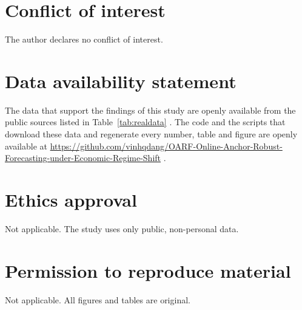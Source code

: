 \documentclass[12pt]{article}
\theoremstyle{plain}
\theoremstyle{remark}
\begin{document}
\section*{Conflict of interest}
The author declares no conflict of interest.

\section*{Data availability statement}
The data that support the findings of this study are openly available from the
public sources listed in Table~\ref{tab:realdata}
\citep{fred2026data,caldara2026gprdata,baker2026epudata}. The code and the scripts
that download these data and regenerate every number, table and figure are openly
available at
\url{https://github.com/vinhqdang/OARF-Online-Anchor-Robust-Forecasting-under-Economic-Regime-Shift}
\citep{dang2026oarfcode}.

\section*{Ethics approval}
Not applicable. The study uses only public, non-personal data.

\section*{Permission to reproduce material}
Not applicable. All figures and tables are original.

\small


\end{document}
